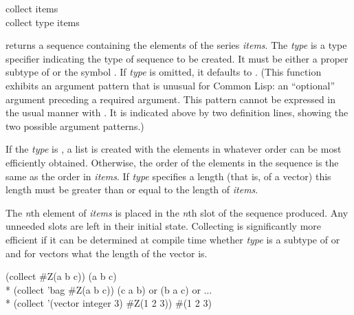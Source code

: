 \begin{defun}[Function]
collect items \\
collect type items

 returns a sequence containing the elements of the series {\it
items}.  The \emph{type} is a type specifier indicating the type of sequence
to be created.  It must be either a proper subtype of  or the
symbol .  If \emph{type} is omitted, it defaults to .
(This function exhibits an argument pattern that is unusual for Common
Lisp:  an ``optional'' argument preceding a required argument.  This
pattern cannot be expressed in the usual manner with .  It
is indicated above by two definition lines, showing the two possible
argument patterns.)

If the \emph{type} is , a list is created with the elements in
whatever order can be most efficiently obtained.  Otherwise, the order of
the elements in the sequence is the same as the order in \emph{items}.  If
\emph{type} specifies a length (that is, of a vector) this length must be
greater than or equal to the length of \emph{items}.

The \emph{n\/}th element of \emph{items} is
placed in the \emph{n\/}th slot of the sequence produced.  Any unneeded slots are
left in their initial state.  Collecting is significantly more efficient if
it can be determined at compile time whether \emph{type} is a subtype of
 or  and for vectors what the length of the vector is.
\begin{lisp}
(collect \#Z(a b c)) {\EV} (a b c) \\*
(collect 'bag \#Z(a b c)) {\EV} (c a b) {\rm or} (b a c) {\rm or $\ldots$} \\*
(collect '(vector integer 3) \#Z(1 2 3)) {\EV} \#(1 2 3)
\end{lisp}
\end{defun}

